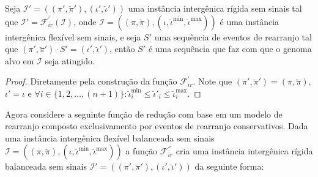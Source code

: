 \begin{lemma}\label{lemma:SVKOAOXA}
Seja $\mathcal{I'} = ((\pi',\breve\pi'),(\iota',\breve\iota'))$ uma instância intergênica rígida sem sinais tal que $\mathcal{I'} = \mathcal{F}_{ir}^{'}(\mathcal{I})$, onde $\mathcal{I} = ((\pi,\breve\pi),(\iota,\breve\iota^{\min},\breve\iota^{\max}))$ é uma instância intergênica flexível sem sinais, e seja $S'$ uma sequência de eventos de rearranjo tal que $(\pi',\breve\pi') \cdot S' = (\iota',\breve\iota')$, então $S'$ é uma sequência que faz com que o genoma alvo em $\mathcal{I}$ seja atingido.
\end{lemma}
\begin{proof}
Diretamente pela construção da função $\mathcal{F}_{ir}^{'}$. Note que $(\pi',\breve\pi') = (\pi,\breve\pi)$, $\iota' = \iota$ e $\forall i \in \{1,2,\dots,({n+1})\}: \breve\iota^{\min}_i \le \breve\iota'_i \le \breve\iota^{\max}_i$.
\end{proof}

Agora considere a seguinte função de redução com base em um modelo de rearranjo composto exclusivamento por eventos de rearranjo conservativos. Dada uma instância intergênica flexível balanceada sem sinais $\mathcal{I} = ((\pi,\breve\pi),(\iota,\breve\iota^{\min},\breve\iota^{\max}))$ a função $\mathcal{F}_{ir}^{''}$ cria uma instância intergênica rígida balanceada sem sinais $\mathcal{I'} = ((\pi',\breve\pi'),(\iota',\breve\iota'))$ da seguinte forma:

